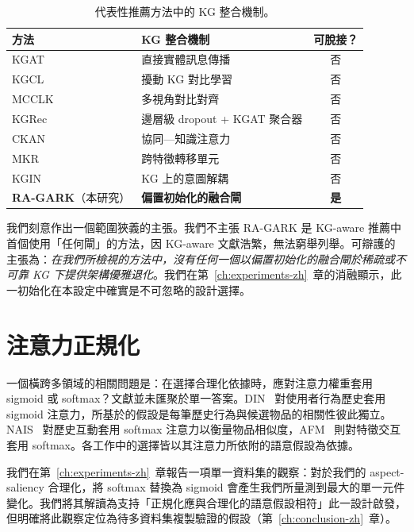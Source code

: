 \begin{table}[!htbp]
\centering
\caption{代表性推薦方法中的 KG 整合機制。}
\label{tab:rw-gating-gap-zh}
\begin{tabular}{l l c}
\toprule
方法 & KG 整合機制 & 可脫接？ \\
\midrule
KGAT~\cite{wang2019kgat}      & 直接實體訊息傳播       & 否 \\
KGCL~\cite{yang2022kgcl}      & 擾動 KG 對比學習       & 否 \\
MCCLK~\cite{zou2022mcclk}     & 多視角對比對齊         & 否 \\
KGRec~\cite{yang2023kgrec}    & 邊層級 dropout + KGAT 聚合器 & 否 \\
CKAN~\cite{wang2020ckan}      & 協同—知識注意力        & 否 \\
MKR~\cite{wang2019mkr}        & 跨特徵轉移單元         & 否 \\
KGIN~\cite{wang2021kgin}      & KG 上的意圖解耦        & 否 \\
\midrule
\textbf{RA-GARK}（本研究）    & \textbf{偏置初始化的融合閘} & \textbf{是} \\
\bottomrule
\end{tabular}
\end{table}
\FloatBarrier

我們刻意作出一個範圍狹義的主張。我們不主張 RA-GARK 是 KG-aware 推薦中首個使用「任何閘」的方法，因 KG-aware 文獻浩繁，無法窮舉列舉。可辯護的主張為：\emph{在我們所檢視的方法中，沒有任何一個以偏置初始化的融合閘於稀疏或不可靠 KG 下提供架構優雅退化}。我們在第~\ref{ch:experiments-zh}~章的消融顯示，此一初始化在本設定中確實是不可忽略的設計選擇。

\section{注意力正規化}
\label{sec:rw-attention-norm-zh}

一個橫跨多領域的相關問題是：在選擇合理化依據時，應對注意力權重套用 sigmoid 或 softmax？文獻並未匯聚於單一答案。DIN~\cite{zhou2018din} 對使用者行為歷史套用 sigmoid 注意力，所基於的假設是每筆歷史行為與候選物品的相關性彼此獨立。NAIS~\cite{he2018nais} 對歷史互動套用 softmax 注意力以衡量物品相似度，AFM~\cite{xiao2017afm} 則對特徵交互套用 softmax。各工作中的選擇皆以其注意力所依附的語意假設為依據。

我們在第~\ref{ch:experiments-zh}~章報告一項單一資料集的觀察：對於我們的 aspect-saliency 合理化，將 softmax 替換為 sigmoid 會產生我們所量測到最大的單一元件變化。我們將其解讀為支持「正規化應與合理化的語意假設相符」此一設計啟發，但明確將此觀察定位為待多資料集複製驗證的假設（第~\ref{ch:conclusion-zh}~章）。


